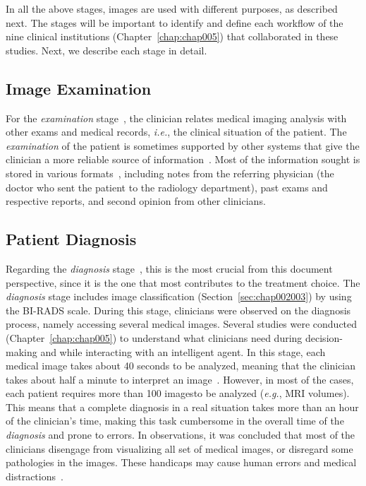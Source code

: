 In all the above stages, images are used with different purposes, as described next.
The stages will be important to identify and define each workflow of the nine clinical institutions (Chapter~\ref{chap:chap005}) that collaborated in these studies.
Next, we describe each stage in detail.

\subsection{Image Examination}
\label{sec:chap002005001}

For the {\it examination} stage~\cite{8621479}, the clinician relates medical imaging analysis with other exams and medical records, {\it i.e.}, the clinical situation of the patient.
The {\it examination} of the patient is sometimes supported by other systems that give the clinician a more reliable source of information~\cite{islam2018recent, DIROBERTO2016950}.
Most of the information sought is stored in various formats~\cite{GIBSON2018113}, including notes from the referring physician (the doctor who sent the patient to the radiology department), past exams and respective reports, and second opinion from other clinicians.

\subsection{Patient Diagnosis}
\label{sec:chap002005002}

Regarding the {\it diagnosis} stage~\cite{https://doi.org/10.1002/cncr.32872}, this is the most crucial from this document perspective, since it is the one that most contributes to the treatment choice.
The {\it diagnosis} stage includes image classification (Section~\ref{sec:chap002003}) by using the \ac{BI-RADS} scale.
During this stage, clinicians were observed on the diagnosis process, namely accessing several medical images.
Several studies were conducted (Chapter~\ref{chap:chap005}) to understand what clinicians need during decision-making and while interacting with an intelligent agent.
In this stage, each medical image takes about 40 seconds to be analyzed, meaning that the clinician takes about half a minute to interpret an image~\cite{jiang2018interpretation}.
However, in most of the cases, each patient requires more than 100 images\footnotemark[6] to be analyzed ({\it e.g.}, MRI volumes).
This means that a complete diagnosis in a real situation takes more than an hour of the clinician's time, making this task cumbersome in the overall time of the {\it diagnosis} and prone to errors.
In observations, it was concluded that most of the clinicians disengage from visualizing all set of medical images, or disregard some pathologies in the images.
These handicaps may cause human errors and medical distractions~\cite{bruno2015understanding}.

